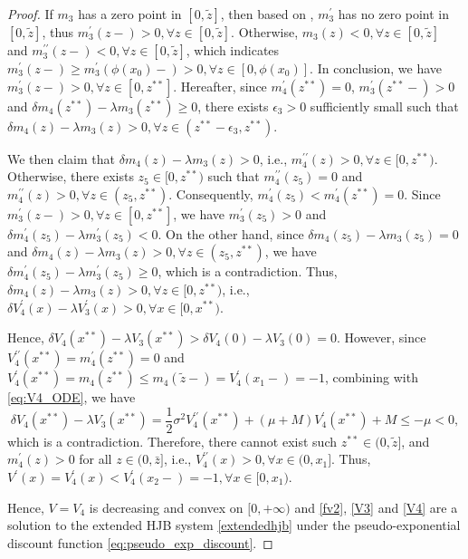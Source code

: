 \documentclass[11pt,reqno]{article}%
\numberwithin{equation}{section}
\begin{document}
\begin{proof}
 If $m_3$ has a zero point in $[0,\tilde z]$, then based on \citet[Lemma 4.1]{shreve1984optimal}, $m^\prime_3$ has no zero point in $[0,\tilde z]$, thus $m^\prime_3(z-)>0, \forall z\in[0,\tilde z]$. Otherwise, $m_3(z)<0, \forall z\in[0,\tilde z]$ and $m_3^{\prime\prime}(z-)<0, \forall z\in[0,\tilde z]$, which indicates $m_3^\prime(z-)\ge m_3^\prime(\phi(x_0)-)>0, \forall z\in[0,\phi(x_0)]$.  In conclusion, we have $m_3^\prime(z-)>0, \forall z\in [0, z^{**}]$. Hereafter, since $m_4^{\prime}(z^{**})=0$, $m_3^{\prime}(z^{**}-)>0$ and $\delta m_4(z^{**})-\lambda m_3(z^{**})\ge 0$, there exists $\epsilon_3>0$ sufficiently small such that $\delta m_4(z)-\lambda m_3(z)>0, \forall z\in(z^{**}-\epsilon_3,z^{**})$.

We then claim that $\delta m_4(z)-\lambda m_3(z)>0$, i.e., $m_4^{\prime\prime}(z) > 0, \forall z\in[0,z^{**})$. Otherwise, there exists $z_5\in[0,z^{**})$ such that $m_4^{\prime\prime}(z_5)=0$ and $m_4^{\prime\prime}(z)>0, \forall z\in(z_5,z^{**})$. Consequently, $m_4^{\prime}(z_5) < m_4^{\prime}(z^{**}) = 0$. Since $m_3^{\prime}(z-)>0, \forall z\in [0,z^{**}]$, we have $m_3^{\prime}(z_5)>0$ and $\delta m_4^{\prime}(z_5)-\lambda m_3^{\prime}(z_5)<0$. On the other hand, since $\delta m_4(z_5)-\lambda m_3(z_5)=0$ and $\delta m_4(z)-\lambda m_3(z)>0, \forall z\in(z_5,z^{**})$, we have $\delta m_4^{\prime}(z_5)-\lambda m_3^{\prime}(z_5)\ge 0$, which is a contradiction. Thus, $\delta m_4(z)-\lambda m_3(z)>0, \forall z\in[0,z^{**})$, i.e., $\delta V_4^{\prime}(x)-\lambda V_3^{\prime}(x)>0, \forall x\in[0,x^{**})$.

Hence, $\delta V_4(x^{**})-\lambda V_3(x^{**})>\delta V_4(0)-\lambda V_3(0)=0$. However, since $V^{\prime\prime}_4(x^{**})=m_4^{\prime}(z^{**})=0$ and $V_4^{\prime}(x^{**})=m_4(z^{**})\le m_4(\tilde z-)=V_4^{\prime}(x_1-)=-1$, combining with \eqref{eq:V4_ODE}, we have
\begin{equation}\nonumber
\delta V_4(x^{**})-\lambda V_3(x^{**}) = \frac{1}{2} \sigma^2 V_4^{\prime\prime}(x^{**}) + (\mu+M)  V^{\prime}_4(x^{**})+M  \le -\mu<0,
\end{equation}
which is a contradiction. Therefore, there cannot exist such $z^{**} \in (0, \tilde z]$, and $m_4^\prime(z) > 0$ for all $z \in (0, \bar z]$, i.e., $V_4^{\prime\prime}(x) > 0, \forall x\in(0,x_1]$. Thus, $V^{\prime}(x)=V^{\prime}_4(x)<V^{\prime}_4(x_2-)=-1, \forall x\in[0,x_1)$. 

Hence, $V=V_4$ is decreasing and convex on $[0,+\infty)$ and \eqref{fv2}, \eqref{V3} and \eqref{V4} are a solution to the extended HJB system \eqref{extendedhjb} under the pseudo-exponential discount function \eqref{eq:pseudo_exp_discount}.
\end{proof}
\end{document}
